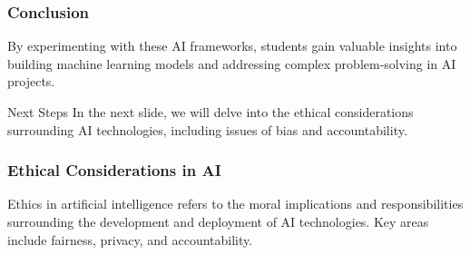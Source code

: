 \documentclass{beamer}
\begin{document}
\begin{frame}[fragile]
    \frametitle{Conclusion}
    By experimenting with these AI frameworks, students gain valuable insights into building machine learning models and addressing complex problem-solving in AI projects.

    \begin{block}{Next Steps}
        In the next slide, we will delve into the ethical considerations surrounding AI technologies, including issues of bias and accountability.
    \end{block}
\end{frame}

\begin{frame}[fragile]
    \frametitle{Ethical Considerations in AI}
    Ethics in artificial intelligence refers to the moral implications and responsibilities surrounding the development and deployment of AI technologies. Key areas include fairness, privacy, and accountability.
\end{frame}
\end{document}
